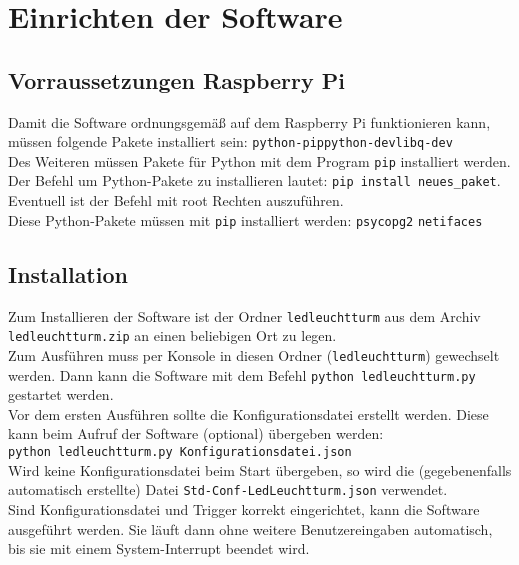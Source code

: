 \documentclass{scrartcl}
\date{}
\begin{document}
\section{Einrichten der Software}
\subsection{Vorraussetzungen Raspberry Pi}
Damit die Software ordnungsgemäß auf dem Raspberry Pi funktionieren kann, müssen folgende Pakete installiert sein: \qquad\lstinline$python-pip$\qquad \lstinline$python-dev$\qquad \lstinline$libq-dev$\\
Des Weiteren müssen Pakete für Python mit dem Program \texttt{pip} installiert werden. Der Befehl um Python-Pakete zu installieren lautet: \lstinline$pip install neues_paket$. Eventuell ist der Befehl mit root Rechten auszuführen.\\
Diese Python-Pakete müssen mit \texttt{pip} installiert werden: \qquad \lstinline$psycopg2$ \qquad \lstinline`netifaces`

\subsection{Installation}
Zum Installieren der Software ist der Ordner \texttt{ledleuchtturm} aus dem Archiv \lstinline`ledleuchtturm.zip` an einen beliebigen Ort zu legen. \\
Zum Ausführen muss per Konsole in diesen Ordner (\texttt{ledleuchtturm}) gewechselt werden. Dann kann die Software mit dem Befehl \texttt{python ledleuchtturm.py} gestartet werden.\\
Vor dem ersten Ausführen sollte die Konfigurationsdatei erstellt werden. Diese kann beim Aufruf der Software (optional) übergeben werden:\\ \texttt{python ledleuchtturm.py Konfigurationsdatei.json}\\
Wird keine Konfigurationsdatei beim Start übergeben, so wird die (gegebenenfalls automatisch erstellte) Datei \lstinline$Std-Conf-LedLeuchtturm.json$ verwendet.\\
Sind Konfigurationsdatei und Trigger korrekt eingerichtet, kann die Software ausgeführt werden. Sie läuft dann ohne weitere Benutzereingaben automatisch, bis sie mit einem System-Interrupt beendet wird.
\end{document}
